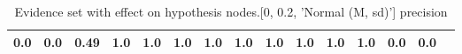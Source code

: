 \begin{table}
\begin{tabular}{c|cc|cc|cc|cc|cc|cc|cc}
\cellcolor{Bittersweet}0.0&\cellcolor{Bittersweet}0.0&\cellcolor{Bittersweet}0.49&\cellcolor{Bittersweet}1.0&\cellcolor{Bittersweet}1.0&\cellcolor{Bittersweet}1.0&\cellcolor{Bittersweet}1.0&\cellcolor{Bittersweet}1.0&\cellcolor{Bittersweet}1.0&\cellcolor{Bittersweet}1.0&\cellcolor{Bittersweet}1.0&\cellcolor{Bittersweet}1.0&\cellcolor{Bittersweet}0.0&\cellcolor{Bittersweet}0.0\\\bottomrule\end{tabular}\caption{Evidence set with effect on hypothesis nodes.[0, 0.2, 'Normal (M, sd)'] precision}\end{table}